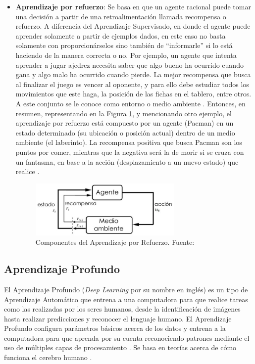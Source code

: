\begin{itemize}
	\item \textbf{Aprendizaje por refuerzo}: Se basa en que un agente racional puede tomar una decisión a partir de una retroalimentación llamada recompensa o refuerzo. A diferencia del Aprendizaje Supervisado, en donde el agente puede aprender solamente a partir de ejemplos dados, en este caso no basta solamente con proporcionárselos sino también de “informarle” si lo está haciendo de la manera correcta o no. Por ejemplo, un agente que intenta aprender a jugar ajedrez necesita saber que algo bueno ha ocurrido cuando gana y algo malo ha ocurrido cuando pierde. La mejor recompensa que busca al finalizar el juego es vencer al oponente, y para ello debe estudiar todos los movimientos que este haga, la posición de las fichas en el tablero, entre otros. A este conjunto se le conoce como entorno o medio ambiente \parencite{bk_russell2004intart}. Entonces, en resumen, representando en la Figura \ref{2:fig5}, y mencionando otro ejemplo, el aprendizaje por refuerzo está compuesto por un agente (Pacman) en un estado determinado (su ubicación o posición actual) dentro de un medio ambiente (el laberinto). La recompensa positiva que busca Pacman son los puntos por comer, mientras que la negativa será la de morir si se cruza con un fantasma, en base a la acción (desplazamiento a un nuevo estado) que realice \parencite{tec_merino2019aprendrefuerzo}.
	\begin{figure}[h]
		\begin{center}
			\includegraphics[width=0.7\textwidth]{2/figures/aprendizaje_refuerzo.jpg}
			\caption{Componentes del Aprendizaje por Refuerzo. Fuente: \cite{bk_sutton2018rl}}
			\label{2:fig5}
		\end{center}
	\end{figure}
\end{itemize}

\subsection{Aprendizaje Profundo}
El Aprendizaje Profundo (\textit{Deep Learning} por su nombre en inglés) es un tipo de Aprendizaje Automático que entrena a una computadora para que realice tareas como las realizadas por los seres humanos, desde la identificación de imágenes hasta realizar predicciones y reconocer el lenguaje humano. El Aprendizaje Profundo configura parámetros básicos acerca de los datos y entrena a la computadora para que aprenda por su cuenta reconociendo patrones mediante el uso de múltiples capas de procesamiento \parencite{gl_sas_deeplearning}. Se basa en teorías acerca de cómo funciona el cerebro humano \parencite{tec_banafa2019deeplearning}.

